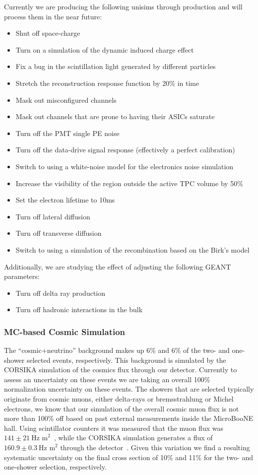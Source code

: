 \documentclass{article}
\begin{document}
Currently we are producing the following unisims through production and will process them in the near future:
\begin{itemize}
\item Shut off space-charge
\item Turn on a simulation of the dynamic induced charge effect 
\item Fix a bug in the scintillation light generated by different particles
\item Stretch the reconstruction response function by 20\% in time 
\item Mask out misconfigured channels
\item Mask out channels that are prone to having their ASICs saturate
\item Turn off the PMT single PE noise
\item Turn off the data-drive signal response (effectively a perfect calibration)
\item Switch to using a white-noise model for the electronics noise simulation
\item Increase the visibility of the region outside the active TPC volume by 50\%
\item Set the electron lifetime to 10ms 
\item Turn off lateral diffusion 
\item Turn off transverse diffusion 
\item Switch to using a simulation of the recombination based on the Birk’s model 
\end{itemize}

\noindent Additionally, we are studying the effect of adjusting the following GEANT parameters:
\begin{itemize}
\item Turn off delta ray production 
\item Turn off hadronic interactions in the bulk
\end{itemize}

\subsubsection{MC-based Cosmic Simulation}\label{sec:cosuncert}
The ``cosmic+neutrino'' background makes up 6\% and 6\% of the two- and one-shower selected events, respectively. This background is simulated by the CORSIKA simulation of the cosmics flux through our detector. Currently to assess an uncertainty on these events we are taking an overall 100\% normalization uncertainty on these events. The showers that are selected typically originate from cosmic muons, either delta-rays or bremsstrahlung or Michel electrons, we know that our simulation of the overall cosmic muon flux is not more than 100\% off based on past external measurements inside the MicroBooNE hall. Using scintillator counters it was measured that the muon flux was $141\pm21~\text{Hz~m}^2$~\cite{datacosflux}, while the CORSIKA simulation generates a flux of $160.9\pm0.3~\text{Hz~m}^2$  through the detector~\cite{mccosflux}. Given this variation we find a resulting systematic uncertainty on the final cross section of 10\% and 11\% for the two- and one-shower selection, respectively. 
 
\end{document}
